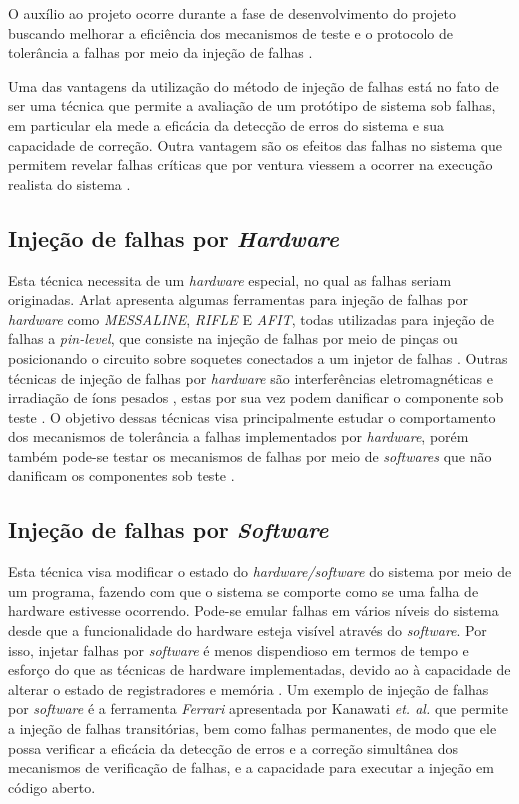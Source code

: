 \documentclass[a4paper,12pt,brazil]{ufms-cpcx}
\begin{document}
O auxílio ao projeto ocorre durante a fase de desenvolvimento do projeto buscando melhorar a eficiência dos mecanismos de teste  e o protocolo de tolerância a falhas por meio da injeção de falhas \cite{Arlat:1990}.

Uma das vantagens da utilização do método de injeção de falhas está no fato de ser uma técnica que permite a avaliação de um protótipo de sistema sob falhas, em particular ela mede a eficácia da detecção de erros do sistema e sua capacidade de correção. Outra vantagem são os efeitos das falhas no sistema que permitem revelar falhas críticas que por ventura viessem a ocorrer na execução realista do sistema \cite{Arlat:2003}.     

\subsection{Injeção de falhas por \textit{Hardware}}

Esta técnica necessita de um \textit{hardware} especial, no qual as falhas seriam originadas. Arlat \cite{Arlat:2003} apresenta algumas ferramentas para injeção de falhas por \textit{hardware} como \textit{MESSALINE}, \textit{RIFLE} E \textit{AFIT}, todas utilizadas para injeção de falhas a \textit{pin-level}, que consiste na injeção de falhas por meio de pinças ou posicionando o circuito sobre soquetes conectados a um injetor de falhas \cite{Arlat:1990, Arlat:2003}. Outras técnicas de injeção de falhas por \textit{hardware} são interferências eletromagnéticas e irradiação de íons pesados \cite{Gunnelo:1989, Arlat:1990, Arlat:2003}, estas por sua vez podem danificar o componente sob teste \cite{Sotoma:1997}. O objetivo dessas técnicas visa principalmente estudar o comportamento dos mecanismos de tolerância a falhas implementados por \textit{hardware}, porém também pode-se testar os mecanismos de falhas por meio de \textit{softwares} que não danificam os componentes sob teste \cite{Martins:1989}.



\subsection{Injeção de falhas por \textit{Software}}

Esta técnica visa modificar o estado do \textit{hardware/software} do sistema por meio de um programa, fazendo com que o sistema se comporte como se uma falha de hardware estivesse ocorrendo. Pode-se emular falhas em vários níveis do sistema desde que a funcionalidade do hardware esteja visível através do \textit{software}. Por isso, injetar falhas por \textit{software} é menos dispendioso em termos de tempo e esforço do que as técnicas de hardware implementadas, devido ao à capacidade de alterar o estado de registradores e memória \cite{Kanawati:1995}. Um exemplo de injeção de falhas por \textit{software} é a ferramenta \textit{Ferrari} apresentada por Kanawati \textit{et. al.} \cite{Kanawati:1995} que permite a injeção de falhas transitórias, bem como falhas permanentes, de modo que ele possa verificar a eficácia da detecção de erros e a correção simultânea dos mecanismos de verificação de falhas, e a capacidade para executar a injeção em código aberto. 
\end{document}
